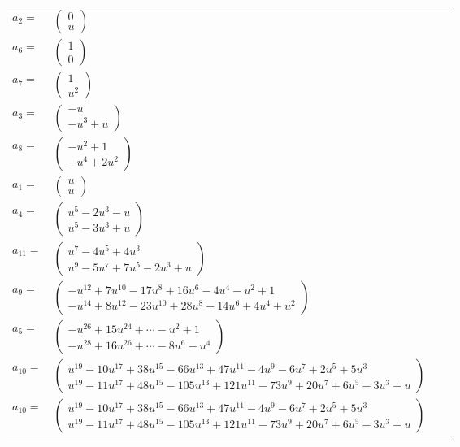 \documentclass[1p]{elsarticle_modified}
\theoremstyle{definition}
\begin{document}
\begin{tabular}{m{7pt} m{180pt} m{7pt} m{180pt} }
\flushright $a_{2}=$&$\begin{pmatrix}0\\u\end{pmatrix}$ \\
\flushright $a_{6}=$&$\begin{pmatrix}1\\0\end{pmatrix}$ \\
\flushright $a_{7}=$&$\begin{pmatrix}1\\u^2\end{pmatrix}$ \\
\flushright $a_{3}=$&$\begin{pmatrix}- u\\- u^3+u\end{pmatrix}$ \\
\flushright $a_{8}=$&$\begin{pmatrix}- u^2+1\\- u^4+2 u^2\end{pmatrix}$ \\
\flushright $a_{1}=$&$\begin{pmatrix}u\\u\end{pmatrix}$ \\
\flushright $a_{4}=$&$\begin{pmatrix}u^5-2 u^3- u\\u^5-3 u^3+u\end{pmatrix}$ \\
\flushright $a_{11}=$&$\begin{pmatrix}u^7-4 u^5+4 u^3\\u^9-5 u^7+7 u^5-2 u^3+u\end{pmatrix}$ \\
\flushright $a_{9}=$&$\begin{pmatrix}- u^{12}+7 u^{10}-17 u^8+16 u^6-4 u^4- u^2+1\\- u^{14}+8 u^{12}-23 u^{10}+28 u^8-14 u^6+4 u^4+u^2\end{pmatrix}$ \\
\flushright $a_{5}=$&$\begin{pmatrix}- u^{26}+15 u^{24}+\cdots- u^2+1\\- u^{28}+16 u^{26}+\cdots-8 u^6- u^4\end{pmatrix}$ \\
\flushright $a_{10}=$&$\begin{pmatrix}u^{19}-10 u^{17}+38 u^{15}-66 u^{13}+47 u^{11}-4 u^9-6 u^7+2 u^5+5 u^3\\u^{19}-11 u^{17}+48 u^{15}-105 u^{13}+121 u^{11}-73 u^9+20 u^7+6 u^5-3 u^3+u\end{pmatrix}$\\ \flushright $a_{10}=$&$\begin{pmatrix}u^{19}-10 u^{17}+38 u^{15}-66 u^{13}+47 u^{11}-4 u^9-6 u^7+2 u^5+5 u^3\\u^{19}-11 u^{17}+48 u^{15}-105 u^{13}+121 u^{11}-73 u^9+20 u^7+6 u^5-3 u^3+u\end{pmatrix}$\\&\end{tabular}
\end{document}

